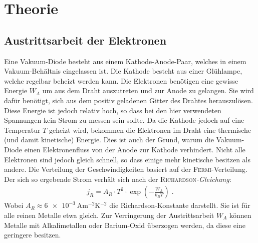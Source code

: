 \documentclass[12pt,a4paper,titlepage,headinclude,bibtotoc]{scrartcl}
\begin{document}
\section{Theorie}
\label{sec:theorie}
\subsection{Austrittsarbeit der Elektronen}
Eine Vakuum-Diode besteht aus einem Kathode-Anode-Paar, welches in einem Vakuum-Behältnis eingelassen ist.
Die Kathode besteht aus einer Glühlampe, welche regelbar beheizt werden kann.
Die Elektronen benötigen eine gewisse Energie $W_A$ um aus dem Draht auszutreten und zur Anode zu gelangen.
Sie wird dafür benötigt, sich aus dem positiv geladenen Gitter des Drahtes herauszulösen.
Diese Energie ist jedoch relativ hoch, so dass bei den hier verwendeten Spannungen kein Strom zu messen sein sollte.
Da die Kathode jedoch auf eine Temperatur $T$ geheizt wird, bekommen die Elektronen im Draht eine thermische (und damit kinetische) Energie.
Dies ist auch der Grund, warum die Vakuum-Diode einen Elektronenfluss von der Anode zur Kathode verhindert.
Nicht alle Elektronen sind jedoch gleich schnell, so dass einige mehr kinetische besitzen als andere.
Die Verteilung der Geschwindigkeiten basiert auf der \textsc{Fermi}-Verteilung.
Der sich so ergebende Strom verhält sich nach der \textsc{Richardson}\emph{-Gleichung}:
\begin{align}
	j_R=A_R\cdot T^{2}\cdot \exp\left(-\frac{W_A}{k_BT}\right)\label{eq:richardson}\; .
\end{align}
Wobei $A_R\approx \SI{6e-3}{\ampere\meter^{-2}\kelvin^{-2}}$ die Richardson-Konstante darstellt.
Sie ist für alle reinen Metalle etwa gleich.
Zur Verringerung der Austrittsarbeit $W_A$ können Metalle mit Alkalimetallen oder Barium-Oxid überzogen werden, da diese eine geringere besitzen.


                                                                                                                                                                      
\end{document}
